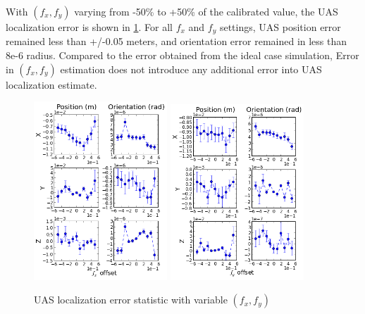 With $(f_x, f_y)$ varying from -50\% to +50\% of the calibrated
value, the UAS localization error is shown in \ref{fig:simfig43-44}.
For all $f_x$ and $f_y$ settings, UAS position error remained less than
+/-0.05 meters, and orientation error remained in less than 8e-6
radius. Compared to the error obtained from the ideal case simulation,
Error in $(f_x, f_y)$ estimation does not introduce any additional error into
UAS localization estimate. 
\begin{figure}[h]
  \centering
  \includegraphics[width=5cm,keepaspectratio=true]{./Figures/SimulationFigures/Figure43.png}
  \includegraphics[width=5cm,keepaspectratio=true]{./Figures/SimulationFigures/Figure44.png}
  \caption{UAS localization error statistic with variable $(f_x, f_y)$}
  \label{fig:simfig43-44}
\end{figure}

